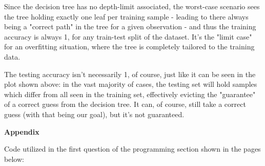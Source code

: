 \documentclass[12pt]{article}
\begin{document}
\begin{enumerate}[leftmargin=\labelsep,resume]
        Since the decision tree has no depth-limit associated, the worst-case scenario sees the tree
        holding exactly one leaf per training sample - leading to there always being a "correct path" in the tree for a given observation - and thus the training accuracy is always 1, for any train-test split of the dataset.
        It's the "limit case" for an overfitting situation, where the tree is completely tailored to the training data.

        The testing accuracy isn't necessarily 1, of course, just like it can be seen in the plot shown above: in the vast majority of cases, the testing set will hold samples which differ from all seen in the training set, effectively evicting the "guarantee" of a correct guess from the decision tree. It can, of course, still take a correct guess (with that being our goal), but it's not guaranteed.

\end{enumerate}

\large{\textbf{Appendix}\vskip 0.3cm}

Code utilized in the first question of the programming section shown in the pages below:


\end{document}
